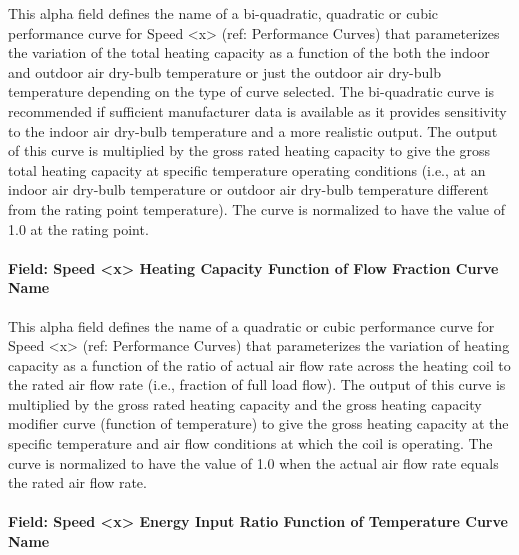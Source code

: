 This alpha field defines the name of a bi-quadratic, quadratic or cubic performance curve for Speed \textless{}x\textgreater{} (ref: Performance Curves) that parameterizes the variation of the total heating capacity as a function of the both the indoor and outdoor air dry-bulb temperature or just the outdoor air dry-bulb temperature depending on the type of curve selected. The bi-quadratic curve is recommended if sufficient manufacturer data is available as it provides sensitivity to the indoor air dry-bulb temperature and a more realistic output. The output of this curve is multiplied by the gross rated heating capacity to give the gross total heating capacity at specific temperature operating conditions (i.e., at an indoor air dry-bulb temperature or outdoor air dry-bulb temperature different from the rating point temperature). The curve is normalized to have the value of 1.0 at the rating point.

\paragraph{Field: Speed \textless{}x\textgreater{} Heating Capacity Function of Flow Fraction Curve Name}\label{field-speed-x-heating-capacity-function-of-flow-fraction-curve-name}

This alpha field defines the name of a quadratic or cubic performance curve for Speed \textless{}x\textgreater{} (ref: Performance Curves) that parameterizes the variation of heating capacity as a function of the ratio of actual air flow rate across the heating coil to the rated air flow rate (i.e., fraction of full load flow). The output of this curve is multiplied by the gross rated heating capacity and the gross heating capacity modifier curve (function of temperature) to give the gross heating capacity at the specific temperature and air flow conditions at which the coil is operating. The curve is normalized to have the value of 1.0 when the actual air flow rate equals the rated air flow rate.

\paragraph{Field: Speed \textless{}x\textgreater{} Energy Input Ratio Function of Temperature Curve Name}\label{field-speed-x-energy-input-ratio-function-of-temperature-curve-name-2}

